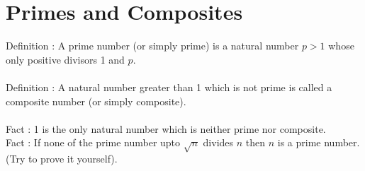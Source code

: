\documentclass[a4paper,10pt]{article}
\begin{document}
\section{Primes and Composites}
Definition : A prime number (or simply prime) is a natural number $p >1$
whose only positive divisors 1 and $p$.\\\\
Definition : A natural number greater than 1 which is not prime is called
a composite number (or simply composite).\\\\
Fact : 1 is the only natural number which is neither prime nor
composite.\\
Fact : If none of the prime number upto
$\sqrt{n}$ divides $n$ then $n$ is a prime number. (Try to prove
it yourself).\\\\
\end{document}
